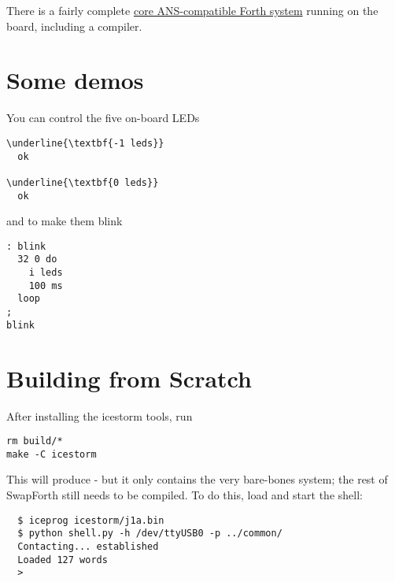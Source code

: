 There is a fairly complete 
\href{http://forth.sourceforge.net/std/dpans/dpans6.htm}{core ANS-compatible Forth system}
running on the board, including a compiler.

\section{Some demos} 

You can control the five on-board LEDs 

\begin{framed}
\begin{Verbatim}[commandchars=\\\{\}]
\underline{\textbf{-1 leds}}
  ok

\underline{\textbf{0 leds}}
  ok
\end{Verbatim}
\end{framed}

\noindent
and to make them blink

\begin{framed}
\begin{Verbatim}[commandchars=\\\{\}]
: blink
  32 0 do
    i leds
    100 ms
  loop
;
blink
\end{Verbatim}
\end{framed}



\section{Building from Scratch}

After installing the icestorm tools, run

\begin{Verbatim}
rm build/*
make -C icestorm
\end{Verbatim}

\noindent
This will produce  - but it only contains the very bare-bones system;
the rest of SwapForth still needs to be compiled.
To do this, load  and start the shell:

\begin{framed}
\begin{Verbatim}
  $ iceprog icestorm/j1a.bin
  $ python shell.py -h /dev/ttyUSB0 -p ../common/
  Contacting... established
  Loaded 127 words
  >
\end{Verbatim}
\end{framed}

